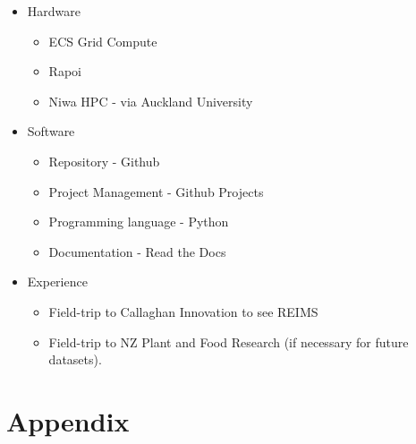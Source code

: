\documentclass{article}
\begin{document}
\begin{itemize}
  \item Hardware 
  \begin{itemize}
    \item ECS Grid Compute 
    \item Rapoi 
    \item Niwa HPC - via Auckland University
  \end{itemize}
  \item Software 
  \begin{itemize}
    \item Repository - Github 
    \item Project Management - Github Projects 
    \item Programming language - Python
    \item Documentation - Read the Docs  
  \end{itemize}
  \item Experience 
  \begin{itemize}
    \item Field-trip to Callaghan Innovation to see REIMS 
    \item Field-trip to NZ Plant and Food Research (if necessary for future datasets). 
  \end{itemize}
\end{itemize}

\section{Appendix}
\label{sec:appendix}




\end{document}
